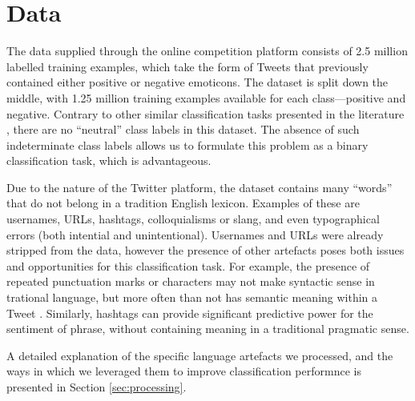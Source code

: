 \section{Data}
\label{sec:data}

The data supplied through the online competition platform consists of 2.5 million labelled training examples, which take the form of Tweets that previously contained either positive or negative emoticons. The dataset is split down the middle, with 1.25 million training examples available for each class---positive and negative. Contrary to other similar classification tasks presented in the literature \cite{tang2014learning, jiang2011target}, there are no ``neutral'' class labels in this dataset. The absence of such indeterminate class labels allows us to formulate this problem as a binary classification task, which is advantageous.

Due to the nature of the Twitter platform, the dataset contains many ``words'' that do not belong in a tradition English lexicon. Examples of these are usernames, URLs, hashtags, colloquialisms or slang, and even typographical errors (both intential and unintentional). Usernames and URLs were already stripped from the data, however the presence of other artefacts poses both issues and opportunities for this classification task. For example, the presence of repeated punctuation marks or characters may not make syntactic sense in trational language, but more often than not has semantic meaning within a Tweet \cite{tang2014learning}. Similarly, hashtags can provide significant predictive power for the sentiment of phrase, without containing meaning in a traditional pragmatic sense.

A detailed explanation of the specific language artefacts we processed, and the ways in which we leveraged them to improve classification performnce is presented in Section \ref{sec:processing}.
